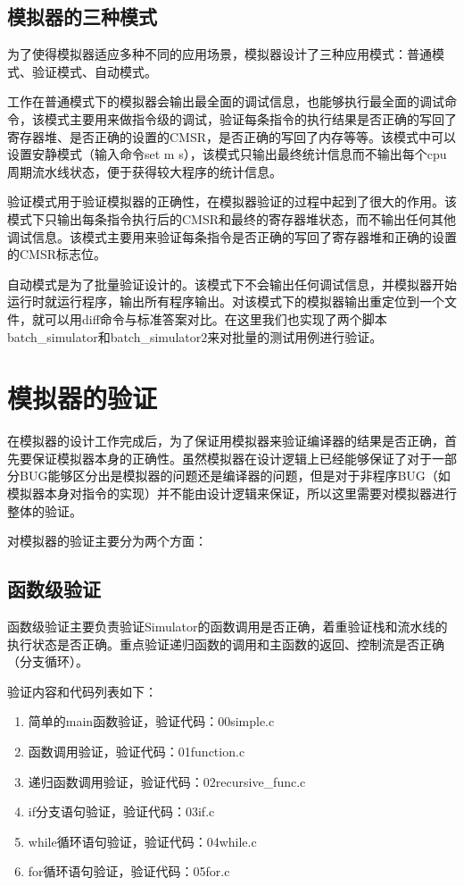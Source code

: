 \documentclass[12pt,a4paper]{article}
\begin{document}
\subsection{模拟器的三种模式}

为了使得模拟器适应多种不同的应用场景，模拟器设计了三种应用模式：普通模式、验证模式、自动模式。

工作在普通模式下的模拟器会输出最全面的调试信息，也能够执行最全面的调试命令，该模式主要用来做指令级的调试，验证每条指令的执行结果是否正确的写回了寄存器堆、是否正确的设置的CMSR，是否正确的写回了内存等等。该模式中可以设置安静模式（输入命令set m s），该模式只输出最终统计信息而不输出每个cpu周期流水线状态，便于获得较大程序的统计信息。

验证模式用于验证模拟器的正确性，在模拟器验证的过程中起到了很大的作用。该模式下只输出每条指令执行后的CMSR和最终的寄存器堆状态，而不输出任何其他调试信息。该模式主要用来验证每条指令是否正确的写回了寄存器堆和正确的设置的CMSR标志位。

自动模式是为了批量验证设计的。该模式下不会输出任何调试信息，并模拟器开始运行时就运行程序，输出所有程序输出。对该模式下的模拟器输出重定位到一个文件，就可以用diff命令与标准答案对比。在这里我们也实现了两个脚本batch\_simulator和batch\_simulator2来对批量的测试用例进行验证。


\section{模拟器的验证}

在模拟器的设计工作完成后，为了保证用模拟器来验证编译器的结果是否正确，首先要保证模拟器本身的正确性。虽然模拟器在设计逻辑上已经能够保证了对于一部分BUG能够区分出是模拟器的问题还是编译器的问题，但是对于非程序BUG（如模拟器本身对指令的实现）并不能由设计逻辑来保证，所以这里需要对模拟器进行整体的验证。

对模拟器的验证主要分为两个方面：

\subsection{函数级验证}

函数级验证主要负责验证Simulator的函数调用是否正确，着重验证栈和流水线的执行状态是否正确。重点验证递归函数的调用和主函数的返回、控制流是否正确（分支循环）。

验证内容和代码列表如下：

\begin{enumerate}
	\item 简单的main函数验证，验证代码：00simple.c
    \item 函数调用验证，验证代码：01function.c
    \item 递归函数调用验证，验证代码：02recursive\_func.c
    \item if分支语句验证，验证代码：03if.c
    \item while循环语句验证，验证代码：04while.c
    \item for循环语句验证，验证代码：05for.c
\end{enumerate}
\end{document}
